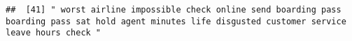 \documentclass[
]{article}
\begin{document}
\begin{verbatim}
##  [41] " worst airline impossible check online send boarding pass boarding pass sat hold agent minutes life disgusted customer service leave hours check "                                                                                                                                                                                                                                                                                                                                                                                                                                                                                                                                                                                                                                                                                                                                                                                                                                                                                                                                                                                                                                                                                                                                                                                                                                                                                                                                                                                                                                                                                                                                                                                                                                             

\end{verbatim}
\end{document}
